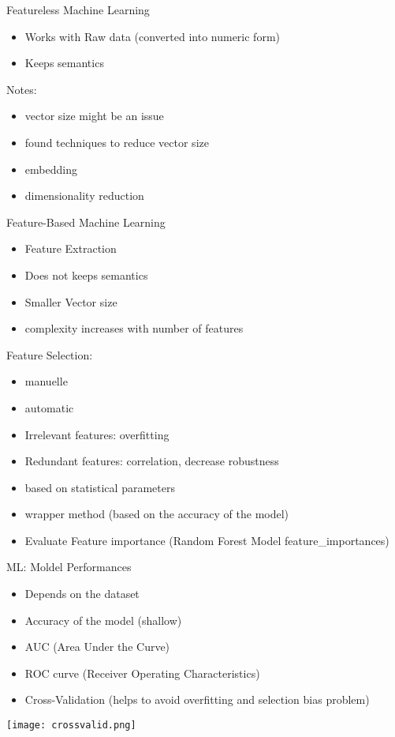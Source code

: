 \begin{frame}{Featureless Machine Learning}
\begin{itemize}
  \item Works with Raw data (converted into numeric form)
  \item Keeps semantics
\end{itemize}

Notes:
\begin{itemize}
  \item vector size might be an issue
  \item found techniques to reduce vector size
  \item embedding
  \item dimensionality reduction
\end{itemize}

\end{frame}

\begin{frame}{Feature-Based Machine Learning}
  \begin{itemize}
    \item Feature Extraction
    \item Does not keeps semantics
    \item Smaller Vector size
    \item complexity increases with number of features
  \end{itemize}
  
  Feature Selection:
  \begin{itemize}
    \item manuelle
    \item automatic
    \item Irrelevant features: overfitting
    \item Redundant features: correlation, decrease robustness
    \item based on statistical parameters
    \item wrapper method (based on the accuracy of the model)
    \item Evaluate Feature importance (Random Forest Model feature\_importances)
  \end{itemize}
\end{frame}



\begin{frame}{ML: Moldel Performances}
  \begin{itemize}
    \item Depends on the dataset
    \item Accuracy of the model (shallow)
    \item AUC (Area Under the Curve)
    \item ROC curve (Receiver Operating Characteristics)
    \item Cross-Validation (helps to avoid overfitting and selection bias problem)
  \end{itemize}
  \centering
\texttt{[image: crossvalid.png]}
\end{frame}


